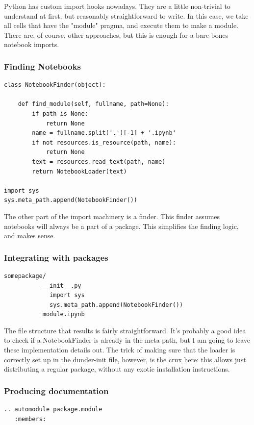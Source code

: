Python has custom import hooks nowadays.
They are a little non-trivial to understand at first,
but reasonably straightforward to write.
In this case,
we take all cells that have the "module" pragma,
and execute them to make a module.
There are,
of course,
other approaches,
but this is enough for a bare-bones notebook imports.


\begin{frame}[fragile]
\frametitle{Finding Notebooks}

\begin{lstlisting}
class NotebookFinder(object):
 
    def find_module(self, fullname, path=None):
        if path is None:
            return None
        name = fullname.split('.')[-1] + '.ipynb'
        if not resources.is_resource(path, name):
            return None
        text = resources.read_text(path, name)
        return NotebookLoader(text)

import sys
sys.meta_path.append(NotebookFinder())
\end{lstlisting}

\end{frame}

The other part of the import machinery is a finder.
This finder assumes notebooks will always be a part of a package.
This simplifies the finding logic, and makes sense.

\begin{frame}[fragile]
\frametitle{Integrating with packages}

\begin{lstlisting}
somepackage/
           __init__.py
             import sys
             sys.meta_path.append(NotebookFinder())
           module.ipynb
\end{lstlisting}

\end{frame}

The file structure that results is fairly straightforward.
It's probably a good idea to check if a NotebookFinder 
is already in the meta path,
but I am going to leave these implementation details out.
The trick of making sure that the loader is correctly set up
in the dunder-init file,
however,
is the crux here:
this allows just distributing a regular package,
without any exotic installation instructions.

\begin{frame}[fragile]
\frametitle{Producing documentation}

\begin{lstlisting}
.. automodule package.module
   :members:
\end{lstlisting}

\end{frame}

